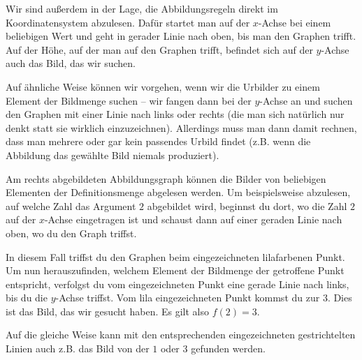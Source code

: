 \documentclass[../../main.tex]{subfiles}
\begin{document}
Wir sind außerdem in der Lage, die Abbildungsregeln direkt im Koordinatensystem abzulesen. Dafür startet man auf der $x$-Achse bei einem beliebigen Wert und geht in gerader Linie nach oben, bis man den Graphen trifft. Auf der Höhe, auf der man auf den Graphen trifft, befindet sich auf der $y$-Achse auch das Bild, das wir suchen.

Auf ähnliche Weise können wir vorgehen, wenn wir die Urbilder zu einem Element der Bildmenge suchen -- wir fangen dann bei der $y$-Achse an und suchen den Graphen mit einer Linie nach links oder rechts (die man sich natürlich nur denkt statt sie wirklich einzuzeichnen). Allerdings muss man dann damit rechnen, dass man mehrere oder gar kein passendes Urbild findet (z.B. wenn die Abbildung das gewählte Bild niemals produziert).

\begin{example}{}
    \parpic[r]{
    }
    
    Am rechts abgebildeten Abbildungsgraph können die Bilder von beliebigen Elementen der Definitionsmenge abgelesen werden. Um beispielsweise abzulesen, auf welche Zahl das Argument $2$ abgebildet wird, beginnst du dort, wo die Zahl $2$ auf der $x$-Achse eingetragen ist und schaust dann auf einer geraden Linie nach oben, wo du den Graph triffst.
    
    In diesem Fall triffst du den Graphen beim eingezeichneten lilafarbenen Punkt. Um nun herauszufinden, welchem Element der Bildmenge der getroffene Punkt entspricht, verfolgst du vom eingezeichneten Punkt eine gerade Linie nach links, bis du die $y$-Achse triffst. Vom lila eingezeichneten Punkt kommst du zur $3$. Dies ist das Bild, das wir gesucht haben. Es gilt also $f(2)=3$.
    
    Auf die gleiche Weise kann mit den entsprechenden eingezeichneten gestrichtelten Linien auch z.B. das Bild von der $1$ oder $3$ gefunden werden.
\end{example}
\end{document}
